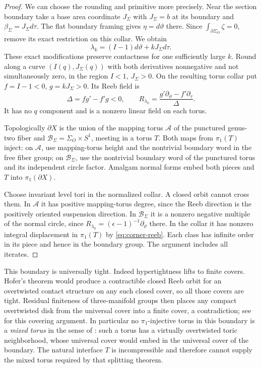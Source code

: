 \documentclass[11pt]{amsart}
\theoremstyle{definition}
\theoremstyle{remark}
\begin{document}
\begin{proof}
We can choose the rounding and primitive more precisely. Near the
section boundary take a base area coordinate $J_\Sigma$ with
$J_\Sigma=b$ at its boundary and
$\beta_\Sigma=J_\Sigma d\tau$. The flat boundary framing gives
$\eta=d\vartheta$ there. Since $\int_{\partial\Sigma_O}\zeta=0$,
remove its exact restriction on this collar. We obtain
\[
 \lambda_k=(I-1)d\vartheta+kJ_\Sigma d\tau.
\]
These exact modifications preserve contactness for one sufficiently
large $k$. Round along a curve $(I(q),J_\Sigma(q))$ with both
derivatives nonnegative and not simultaneously zero, in the region
$I<1$, $J_\Sigma>0$. On the resulting torus collar put
$f=I-1<0$, $g=kJ_\Sigma>0$. Its Reeb field is
\begin{equation}\label{eq:corner-reeb}
 \Delta=fg'-f'g<0,\qquad
 R_{\lambda_k}=\frac{g'\partial_\vartheta-f'\partial_\tau}{\Delta}.
\end{equation}
It has no $q$ component and is a nonzero linear field on each torus.

Topologically $\partial X$ is the union of the mapping torus
$\mathcal A$ of the punctured genus-two fiber and
$\mathcal B_\Sigma=\Sigma_O\times S^1$, meeting in a torus $T$.
Both maps from $\pi_1(T)$ inject: on $\mathcal A$, use mapping-torus
height and the nontrivial boundary word in the free fiber group; on
$\mathcal B_\Sigma$, use the nontrivial boundary word of the punctured
torus and its independent circle factor. Amalgam normal forms embed
both pieces and $T$ into $\pi_1(\partial X)$.

Choose invariant level tori in the normalized collar. A closed orbit
cannot cross them. In $\mathcal A$ it has positive mapping-torus
degree, since the Reeb direction is the positively oriented suspension
direction. In $\mathcal B_\Sigma$ it is a nonzero negative multiple
of the normal circle, since
$R_{\lambda_k}=(\epsilon-1)^{-1}\partial_\vartheta$ there.
In the collar it has nonzero integral displacement in $\pi_1(T)$
by \eqref{eq:corner-reeb}. Each class has infinite order in its piece
and hence in the boundary group. The argument includes all iterates.
\end{proof}

This boundary is universally tight. Indeed hypertightness lifts to
finite covers. Hofer's theorem \cite{Hof93} would produce a
contractible closed Reeb orbit for an overtwisted contact structure
on any such closed cover, so all those covers are tight. Residual finiteness of
three-manifold groups then places any compact overtwisted disk from
the universal cover into a finite cover, a contradiction; see
\cite[Lemma 4.23]{CP25} for this covering argument.
In particular no $\pi_1$-injective torus in this boundary is a
\emph{mixed torus} in the sense of \cite{CM25}: such a torus has a
virtually overtwisted toric neighborhood, whose universal cover would
embed in the universal cover of the boundary. The natural interface
$T$ is incompressible and therefore cannot supply the mixed torus
required by that splitting theorem.
\end{document}
